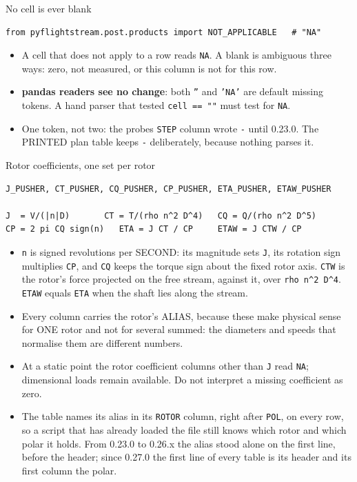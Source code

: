 \documentclass[aspectratio=169,10pt]{beamer}
\newcommand{\code}[1]{\texttt{\small #1}}
\begin{document}
\begin{frame}[fragile]{No cell is ever blank}
\begin{lstlisting}
from pyflightstream.post.products import NOT_APPLICABLE   # "NA"
\end{lstlisting}
  \begin{itemize}
    \item A cell that does not apply to a row reads \code{NA}. A blank is ambiguous three ways: zero, not measured, or this column is not for this row.
    \item \textbf{pandas readers see no change}: both \code{''} and \code{'NA'} are default missing tokens. A hand parser that tested \code{cell == ""} must test for \code{NA}.
    \item One token, not two: the probes \code{STEP} column wrote \code{-} until 0.23.0. The PRINTED plan table keeps \code{-} deliberately, because nothing parses it.
  \end{itemize}
\end{frame}

\begin{frame}[fragile]{Rotor coefficients, one set per rotor}
\begin{lstlisting}
J_PUSHER, CT_PUSHER, CQ_PUSHER, CP_PUSHER, ETA_PUSHER, ETAW_PUSHER

J  = V/(|n|D)       CT = T/(rho n^2 D^4)   CQ = Q/(rho n^2 D^5)
CP = 2 pi CQ sign(n)   ETA = J CT / CP     ETAW = J CTW / CP
\end{lstlisting}
  \begin{itemize}
    \item \code{n} is signed revolutions per SECOND: its magnitude sets \code{J}, its rotation sign multiplies \code{CP}, and \code{CQ} keeps the torque sign about the fixed rotor axis. \code{CTW} is the rotor's force projected on the free stream, against it, over \code{rho n\textasciicircum{}2 D\textasciicircum{}4}. \code{ETAW} equals \code{ETA} when the shaft lies along the stream.
    \item Every column carries the rotor's ALIAS, because these make physical sense for ONE rotor and not for several summed: the diameters and speeds that normalise them are different numbers.
    \item At a static point the rotor coefficient columns other than \code{J} read \code{NA}; dimensional loads remain available. Do not interpret a missing coefficient as zero.
    \item The table names its alias in its \code{ROTOR} column, right after \code{POL}, on every row, so a script that has already loaded the file still knows which rotor and which polar it holds. From 0.23.0 to 0.26.x the alias stood alone on the first line, before the header; since 0.27.0 the first line of every table is its header and its first column the polar.
  \end{itemize}
\end{frame}
\end{document}
